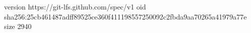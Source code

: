 version https://git-lfs.github.com/spec/v1
oid sha256:25cb461487adff89525ce360f411198557250092c2fbda9aa70265a41979a77e
size 2940
